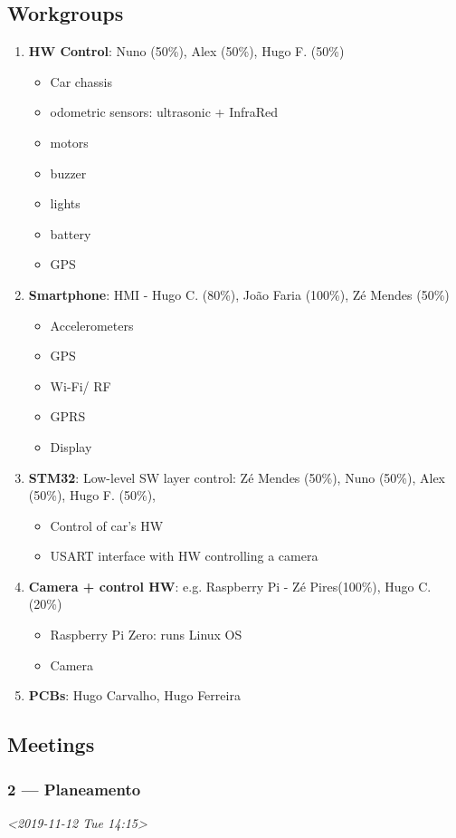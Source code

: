 \documentclass[11pt]{article}
\begin{document}
\subsection{Workgroups}
\label{sec:org5a6642b}
\begin{enumerate}
\item \textbf{HW Control}: Nuno (50\%), Alex (50\%), Hugo F. (50\%)
\begin{itemize}
\item Car chassis
\item odometric sensors: ultrasonic + InfraRed
\item motors
\item buzzer
\item lights
\item battery
\item GPS
\end{itemize}
\item \textbf{Smartphone}: HMI - Hugo C. (80\%), João Faria (100\%), Zé Mendes (50\%)
\begin{itemize}
\item Accelerometers
\item GPS
\item Wi-Fi/ RF
\item GPRS
\item Display
\end{itemize}
\item \textbf{STM32}: Low-level SW layer control: Zé Mendes (50\%), Nuno (50\%), Alex (50\%),
Hugo F. (50\%),
\begin{itemize}
\item Control of car's HW
\item USART interface with HW controlling a camera
\end{itemize}
\item \textbf{Camera + control HW}: e.g. Raspberry Pi - Zé Pires(100\%), Hugo C. (20\%)
\begin{itemize}
\item Raspberry Pi Zero: runs Linux OS
\item Camera
\end{itemize}
\item \textbf{PCBs}: Hugo Carvalho, Hugo Ferreira
\end{enumerate}
\subsection{Meetings}
\label{sec:orgaefaf80}
\subsubsection{2 --- Planeamento}
\label{sec:orgca11fd1}
\textit{<2019-11-12 Tue 14:15>}
\end{document}
